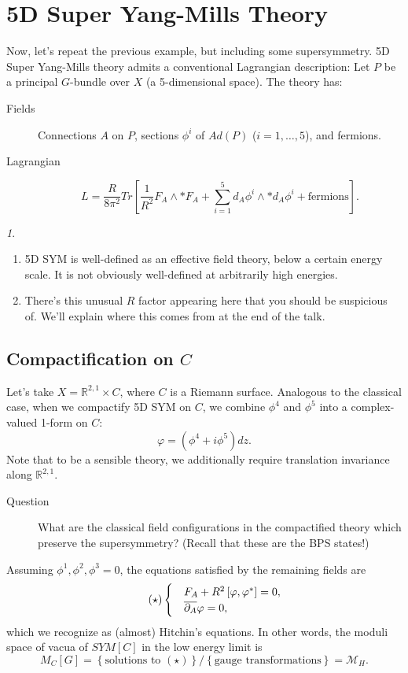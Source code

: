 \documentclass[oneside,english]{amsbook}
\numberwithin{section}{chapter}
\numberwithin{equation}{section}
\numberwithin{figure}{section}
\theoremstyle{plain}
\theoremstyle{definition}
\theoremstyle{remark}
\newtheorem*{rem*}{\protect\remarkname}
\theoremstyle{definition}
\theoremstyle{definition}
\theoremstyle{plain}
\providecommand{\remarkname}{Remark}
\begin{document}
\section{5D Super Yang-Mills Theory}

Now, let's repeat the previous example, but including some supersymmetry.
5D Super Yang-Mills theory admits a conventional Lagrangian description:
Let $P$ be a principal $G$-bundle over $X$ (a 5-dimensional space).
The theory has:
\begin{description}
\item [{Fields}] Connections $A$ on $P$, sections $\phi^{i}$ of $Ad\left(P\right)$
($i=1,\ldots,5$), and fermions.
\item [{Lagrangian}]
\[
L=\frac{R}{8\pi^{2}}Tr\left[\frac{1}{R^{2}}F_{A}\wedge*F_{A}+\sum_{i=1}^{5}d_{A}\phi^{i}\wedge*d_{A}\phi^{i}+\mbox{fermions}\right].
\]
\end{description}
\begin{rem*}
~
\begin{enumerate}
\item 5D SYM is well-defined as an effective field theory, below a certain
energy scale. It is not obviously well-defined at arbitrarily high
energies.
\item There's this unusual $R$ factor appearing here that you should be
suspicious of. We'll explain where this comes from at the end of the
talk.
\end{enumerate}
\end{rem*}

\subsection*{Compactification on $C$}

Let's take $X=\mathbb{R}^{2,1}\times C$, where $C$ is a Riemann
surface. Analogous to the classical case, when we compactify 5D SYM
on $C$, we combine $\phi^{4}$ and $\phi^{5}$ into a complex-valued
1-form on $C$:
\[
\varphi=\left(\phi^{4}+i\phi^{5}\right)dz.
\]
Note that to be a sensible theory, we additionally require translation 
invariance along $\mathbb{R}^{2,1}$.
\begin{description}
\item [{Question}] What are the classical field configurations in the compactified
theory which preserve the supersymmetry? (Recall that these are the
BPS states!)
\end{description}
Assuming $\phi^{1},\phi^{2},\phi^{3}=0$, the equations satisfied
by the remaining fields are
\[
\tag{\ensuremath{\star}}\begin{cases}
 & F_{A}+R^{2}\left[\varphi,\varphi^{*}\right]=0,\\
 & \overline{\partial_{A}}\varphi=0,
\end{cases}
\]
which we recognize as (almost) Hitchin's equations. In other words,
the moduli space of vacua of $SYM[C]$ in the low energy limit is
\[
M_{C}\left[G\right]=\left\{ \mbox{solutions to }(\star)\right\} /\left\{ \mbox{gauge transformations}\right\} =\mathcal{M}_{H}.
\]
\end{document}

